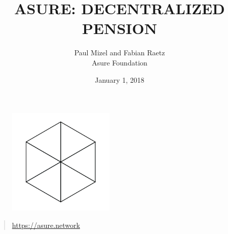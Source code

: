\begin{figure}
    \centering
    \includegraphics[width=2.0in]{../img/logo.png}
\end{figure}

\title{ASURE: DECENTRALIZED PENSION}
\author{Paul Mizel and Fabian Raetz \\Asure Foundation}
\date{January 1, 2018}
\maketitle

\vskip 2.5in

\begin{quote}
	\centering
	\url{https://asure.network}
\end{quote}

\newpage 
